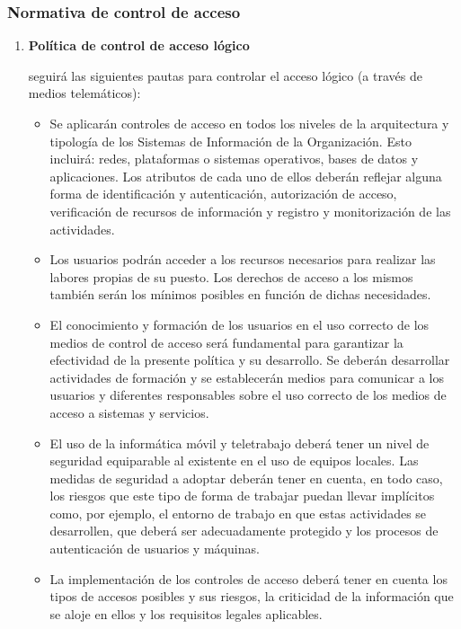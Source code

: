 
\subsubsection{Normativa de control de acceso}

\begin{enumerate}[label=\alph*)]

    \item \textbf{Política de control de acceso lógico}

    \Beneficiario{} seguirá las siguientes pautas para controlar el acceso lógico (a través de medios telemáticos):

    \begin{itemize}
      \item Se aplicarán controles de acceso en todos los niveles de la arquitectura y tipología de los Sistemas de Información de la Organización. Esto incluirá: redes, plataformas o sistemas operativos, bases de datos y aplicaciones. Los atributos de cada uno de ellos deberán reflejar alguna forma de identificación y autenticación, autorización de acceso, verificación de recursos de información y registro y monitorización de las actividades.
      \item Los usuarios podrán acceder a los recursos necesarios para realizar las labores propias de su puesto. Los derechos de acceso a los mismos también serán los mínimos posibles en función de dichas necesidades.
      \item El conocimiento y formación de los usuarios en el uso correcto de los medios de control de acceso será fundamental para garantizar la efectividad de la presente política y su desarrollo. Se deberán desarrollar actividades de formación y se establecerán medios para comunicar a los usuarios y diferentes responsables sobre el uso correcto de los medios de acceso a sistemas y servicios.
      \item El uso de la informática móvil y teletrabajo deberá tener un nivel de seguridad equiparable al existente en el uso de equipos locales. Las medidas de seguridad a adoptar deberán tener en cuenta, en todo caso, los riesgos que este tipo de forma de trabajar puedan llevar implícitos como, por ejemplo, el entorno de trabajo en que estas actividades se desarrollen, que deberá ser adecuadamente protegido y los procesos de autenticación de usuarios y máquinas.
      \item La implementación de los controles de acceso deberá tener en cuenta los tipos de accesos posibles y sus riesgos, la criticidad de la información que se aloje en ellos y los requisitos legales aplicables.

\end{itemize}
\end{enumerate}
